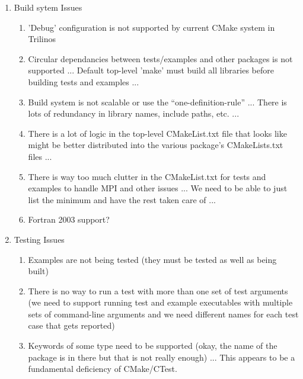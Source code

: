 \documentclass[pdf,ps2pdf,11pt]{SANDreport}
\begin{document}
\begin{enumerate}

{}\item Build sytem Issues

  \begin{enumerate}

  {}\item 'Debug' configuration is not supported by current CMake
  system in Trilinos

  {}\item Circular dependancies between tests/examples and other
  packages is not supported ... Default top-level 'make' must build
  all libraries before building tests and examples ...

  {}\item Build system is not scalable or use the
  ``one-definition-rule'' ... There is lots of redundancy in library
  names, include paths, etc. ...

  {}\item There is a lot of logic in the top-level CMakeList.txt file
  that looks like might be better distributed into the various
  package's CMakeLists.txt files ...

  {}\item There is way too much clutter in the CMakeList.txt for tests
  and examples to handle MPI and other issues ... We need to be able
  to just list the minimum and have the rest taken care of ...

  {}\item Fortran 2003 support?

  \end{enumerate}

{}\item Testing Issues

  \begin{enumerate}

  {}\item Examples are not being tested (they must be tested as well
  as being built)

  {}\item There is no way to run a test with more than one set of test
  arguments (we need to support running test and example executables
  with multiple sets of command-line arguments and we need different
  names for each test case that gets reported)

  {}\item Keywords of some type need to be supported (okay, the name
  of the package is in there but that is not really enough) ... This
  appears to be a fundamental deficiency of CMake/CTest.

  \end{enumerate}

\end{enumerate}
\end{document}
